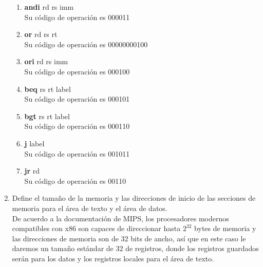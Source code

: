 \documentclass{article}
\begin{document}
\begin{enumerate}
{\begin{enumerate}
				\item{ \textbf{andi} rd rs imm\\
					Su código de operación es 000011\\
				}
				
				\item{ \textbf{or} rd rs rt\\
					Su código de operación es 00000000100\\
				}
				
				\item{ \textbf{ori} rd rs imm\\
					Su código de operación es 000100\\
				}
				
				\item{ \textbf{beq} rs rt label\\
					Su código de operación es 000101 \\
				}
				
				\item{ \textbf{bgt} rs rt label\\
					Su código de operación es 000110\\
				}
				
				\item{ \textbf{j} label\\
					Su código de operación es 001011\\
				}
				
				\item{ \textbf{jr} rd\\
					Su código de operación es 00110
				}
			\end{enumerate}
			
			
			
		}
		\item {
			Define el tamaño de la memoria y las direcciones de inicio de las secciones de memoria para el área de texto y el área de datos.\\
			
			De acuerdo a la documentación de MIPS, los procesadores modernos compatibles con x86 son capaces de direccionar hasta $2^{32}$ bytes de memoria y las direcciones de memoria son de 32 bits de ancho, así que en este caso le daremos un tamaño estándar de 32 de registros, donde los registros guardados serán para los datos y los registros locales para el área de texto.
		}
	\end{enumerate}
\end{document}

